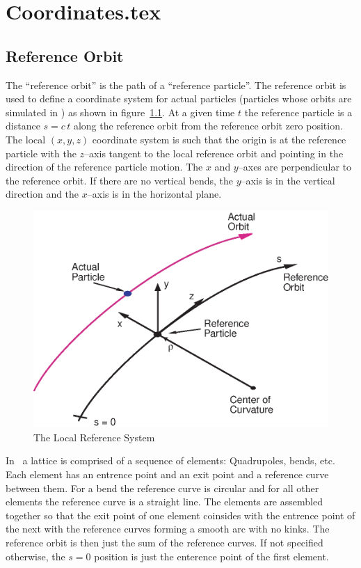 \chapter{Coordinates.tex}

\section{Reference Orbit}
\label{sec:ref}

The ``reference orbit'' is the path of a ``reference particle''.  The
reference orbit is used to define a coordinate system for actual
particles (particles whose orbits are simulated in \bmad) as shown in
figure~\ref{f:local_coords}. At a given time $t$ the reference
particle is a distance $s = c \, t$ along the reference orbit from the
reference orbit zero position. The local $(x, y, z)$ coordinate system
is such that the origin is at the reference particle with the
$z$--axis tangent to the local reference orbit and pointing in the
direction of the reference particle motion. The $x$ and $y$--axes are
perpendicular to the reference orbit. If there are no vertical bends,
the $y$--axis is in the vertical direction and the $x$--axis is in the
horizontal plane.

\begin{figure}[tb]
\centering
\includegraphics{local_coords.ps}
\caption{The Local Reference System}
\label{f:local_coords}
\end{figure}

In \bmad\ a lattice is comprised of a sequence of elements:
Quadrupoles, bends, etc. Each element has an entrence point and an
exit point and a reference curve between them. For a bend the
reference curve is circular and for all other elements the reference
curve is a straight line. The elements are assembled together so that
the exit point of one element coinsides with the entrence point of the
next with the reference curves forming a smooth arc with no kinks. The
reference orbit is then just the sum of the reference curves. If not
specified otherwise, the $s = 0$ position is just the enterence point
of the first element.

